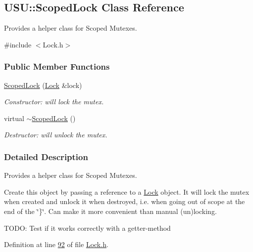 \hypertarget{class_u_s_u_1_1_scoped_lock}{\subsection{\-U\-S\-U\-:\-:\-Scoped\-Lock \-Class \-Reference}
\label{class_u_s_u_1_1_scoped_lock}
}


\-Provides a helper class for \-Scoped \-Mutexes.  




{\ttfamily \#include $<$\-Lock.\-h$>$}

\subsubsection*{\-Public \-Member \-Functions}
\begin{DoxyCompactItemize}
\item 
\hyperlink{class_u_s_u_1_1_scoped_lock_aa92db605fefa48f75be29b86ad0d6186}{\-Scoped\-Lock} (\hyperlink{class_u_s_u_1_1_lock}{\-Lock} \&lock)
\begin{DoxyCompactList}\small\item\em \-Constructor\-: will lock the mutex. \end{DoxyCompactList}\item 
virtual \hyperlink{class_u_s_u_1_1_scoped_lock_a5cf581cbe18004e6fec30724c5f94071}{$\sim$\-Scoped\-Lock} ()
\begin{DoxyCompactList}\small\item\em \-Destructor\-: will unlock the mutex. \end{DoxyCompactList}\end{DoxyCompactItemize}


\subsubsection{\-Detailed \-Description}
\-Provides a helper class for \-Scoped \-Mutexes. 

\-Create this object by passing a reference to a \hyperlink{class_u_s_u_1_1_lock}{\-Lock} object. \-It will lock the mutex when created and unlock it when destroyed, i.\-e. when going out of scope at the end of the \char`\"{}\}\char`\"{}. \-Can make it more convenient than manual (un)locking.

\-T\-O\-D\-O\-: \-Test if it works correctly with a getter-\/method 

\-Definition at line \hyperlink{_lock_8h_source_l00092}{92} of file \hyperlink{_lock_8h_source}{\-Lock.\-h}.



